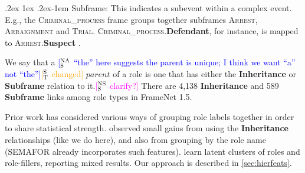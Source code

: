 \documentclass[11pt,a4paper]{article}
\makeatletter
\newcommand{\ensuretext}[1]{#1}
\newcommand{\nssmarker}{\ensuretext{\textcolor{magenta}{\ensuremath{^{\textsc{NS}}_{\textsc{S}}}}}}
\newcommand{\stmarker}{\ensuretext{\textcolor{orange}{\ensuremath{^{\textsc{S}}_{\textsc{T}}}}}}
\newcommand{\nasmarker}{\ensuretext{\textcolor{blue}{\ensuremath{^{\textsc{NA}}_{\textsc{S}}}}}}
\newcommand{\arkcomment}[3]{\ensuretext{\textcolor{#3}{[#1 #2]}}}
\newcommand{\nss}[1]{\arkcomment{\nssmarker}{#1}{magenta}}
\newcommand{\st}[1]{\arkcomment{\stmarker}{#1}{orange}}
\newcommand{\nascomment}[1]{\arkcomment{\nasmarker}{#1}{blue}}
\renewcommand{\paragraph}{%
  \@startsection{paragraph}{4}%
  {\z@}{.2ex \@plus 1ex \@minus .2ex}{-1em}%
  {\normalfont\normalsize\bfseries}%
}
\newcommand{\fnf}[1]{\textsc{\textsf{#1}}} %
\newcommand{\fnr}[1]{\textbf{\textsf{#1}}} %
\newcommand{\fnlu}[1]{\textsf{#1}} %
\newcommand{\finalversion}[1]{}
\makeatother
\begin{document}

\paragraph{Subframe:} This indicates a subevent within a complex event. 
E.g., the \fnf{Criminal\_process} frame groups together subframes 
\fnf{Arrest}, \fnf{Arraignment} and \fnf{Trial}.
\fnf{Criminal\_process}.\fnr{Defendant}, for instance, is mapped to 
\fnf{Arrest}.\fnr{Suspect}%
\finalversion{
\fnf{Trial}.\fnr{Defendant}, and \fnf{Sentencing}.\fnr{Convict}
}.

We say that a \nascomment{``the'' here suggests the parent is
unique; I think we want ``a'' not ``the''}\st{changed} $\textit{parent}$ of a
role is one that has either the \textbf{Inheritance} or \textbf{Subframe}
relation to it.\nss{clarify?}
There are 4,138 \textbf{Inheritance} and 589 \textbf{Subframe} links among role
types in FrameNet 1.5.

Prior work has %
considered various ways of grouping role labels together in order to share statistical strength. 
\citet{matsubayashi-09} observed small gains from using the \textbf{Inheritance} relationships (like we do here), 
and also from grouping by the role name (SEMAFOR already incorporates such features).
\citet{baldewein-04} learn latent clusters of roles and role-fillers, reporting mixed results.
Our approach is described in \cref{sec:hierfeats}.
\end{document}
